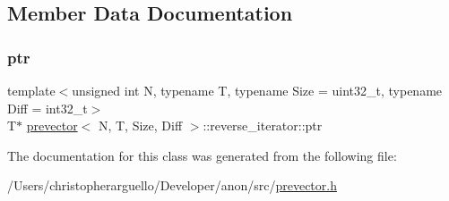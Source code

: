 \subsection{Member Data Documentation}
\mbox{\label{classprevector_1_1reverse__iterator_a4ba7614268ebf6b172dc9b77a192dc9d}} 
\subsubsection{\texorpdfstring{ptr}{ptr}}
{\footnotesize\ttfamily template$<$unsigned int N, typename T, typename Size = uint32\+\_\+t, typename Diff = int32\+\_\+t$>$ \\
T$\ast$ \mbox{\hyperlink{classprevector}{prevector}}$<$ N, T, Size, Diff $>$\+::reverse\+\_\+iterator\+::ptr\hspace{0.3cm}{\ttfamily [private]}}



The documentation for this class was generated from the following file\+:\begin{DoxyCompactItemize}
\item 
/\+Users/christopherarguello/\+Developer/anon/src/\mbox{\hyperlink{prevector_8h}{prevector.\+h}}\end{DoxyCompactItemize}
